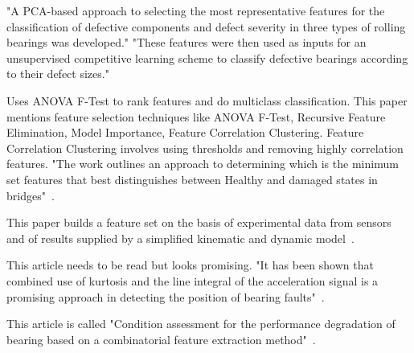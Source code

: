 \documentclass[]{article}
\begin{document}
"A PCA-based approach to selecting the most representative features for the classification of defective components and defect severity in three types of rolling bearings was developed." "These features were then used as inputs for an unsupervised competitive learning scheme to classify defective bearings according to their defect sizes." ~\cite{malhi2004pca}


Uses ANOVA F-Test to rank features and do multiclass classification. 
This paper mentions feature selection techniques like ANOVA F-Test, Recursive Feature Elimination, Model Importance, Feature Correlation Clustering. 
Feature Correlation Clustering involves using thresholds and removing highly correlation features.
"The work outlines an approach to determining which is the minimum set features that best distinguishes between Healthy and damaged states in bridges"~\cite{buckley2023feature}.

This paper builds a feature set on the basis of experimental data from sensors and of results supplied by a simplified kinematic and dynamic model~\cite{d2019physical}.

This article needs to be read but looks promising. "It has been shown that combined use of kurtosis and the line integral of the acceleration signal is a promising approach in detecting the position of bearing faults"~\cite{kateris2014machine}.

This article is called "Condition assessment for the performance degradation of bearing based on a combinatorial feature extraction method"~\cite{hong2014condition}.
\end{document}
